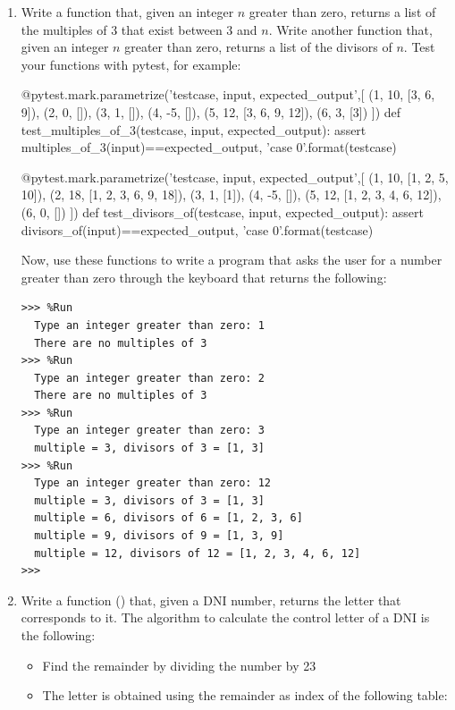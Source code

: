 \documentclass[
  fontsize=10pt,
  a4paper,
]{scrartcl}
\begin{document}
\begin{enumerate}


\item Write a function that, given an integer $n$ greater than zero, returns a list of the multiples of 3 that exist between 3 and $n$. Write another function that, given an integer $n$ greater than zero, returns a list of the divisors of $n$. Test your functions with pytest, for example:

\begin{python}
@pytest.mark.parametrize('testcase, input, expected_output',[
    (1, 10, [3, 6, 9]),
    (2, 0, []),
    (3, 1, []),
    (4, -5, []),
    (5, 12, [3, 6, 9, 12]),
    (6, 3, [3])
    ])
def test_multiples_of_3(testcase, input, expected_output):
    assert multiples_of_3(input)==expected_output, 'case {0}'.format(testcase)

@pytest.mark.parametrize('testcase, input, expected_output',[
    (1, 10, [1, 2, 5, 10]),
    (2, 18, [1, 2, 3, 6, 9, 18]),
    (3, 1, [1]),
    (4, -5, []),
    (5, 12, [1, 2, 3, 4, 6, 12]),
    (6, 0, [])
    ])
def test_divisors_of(testcase, input, expected_output):
    assert divisors_of(input)==expected_output, 'case {0}'.format(testcase)
\end{python}

Now, use these functions to write a  program that asks the user for a number greater than zero through the keyboard that returns the following:

\begin{Verbatim}[frame=single]
>>> %Run 
  Type an integer greater than zero: 1
  There are no multiples of 3
>>> %Run 
  Type an integer greater than zero: 2
  There are no multiples of 3
>>> %Run 
  Type an integer greater than zero: 3
  multiple = 3, divisors of 3 = [1, 3]
>>> %Run 
  Type an integer greater than zero: 12
  multiple = 3, divisors of 3 = [1, 3]
  multiple = 6, divisors of 6 = [1, 2, 3, 6]
  multiple = 9, divisors of 9 = [1, 3, 9]
  multiple = 12, divisors of 12 = [1, 2, 3, 4, 6, 12]
>>> 
\end{Verbatim}


\item Write a function () that, given a DNI number, returns the letter that corresponds to it.
%
The algorithm to calculate the control letter of a DNI is the following:
\begin{itemize}
\item Find the remainder by dividing the number by 23
\item The letter is obtained using the remainder as
index of the following table:
  

\end{itemize}
\end{enumerate}
\end{document}
